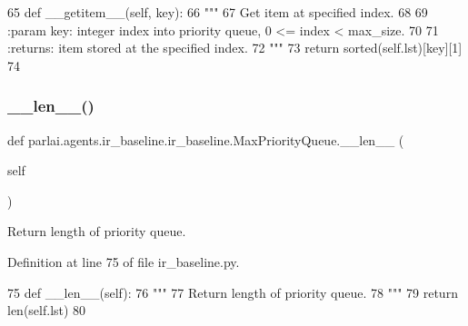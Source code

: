 \begin{DoxyCode}
65     \textcolor{keyword}{def }\_\_getitem\_\_(self, key):
66         \textcolor{stringliteral}{"""}
67 \textcolor{stringliteral}{        Get item at specified index.}
68 \textcolor{stringliteral}{}
69 \textcolor{stringliteral}{        :param key: integer index into priority queue, 0 <= index < max\_size.}
70 \textcolor{stringliteral}{}
71 \textcolor{stringliteral}{        :returns: item stored at the specified index.}
72 \textcolor{stringliteral}{        """}
73         \textcolor{keywordflow}{return} sorted(self.lst)[key][1]
74 
\end{DoxyCode}
\mbox{\label{classparlai_1_1agents_1_1ir__baseline_1_1ir__baseline_1_1MaxPriorityQueue_a7b1b8f3a2f17a0d4bd3c202bc3bdee78}} 
\subsubsection{\texorpdfstring{\+\_\+\+\_\+len\+\_\+\+\_\+()}{\_\_len\_\_()}}
{\footnotesize\ttfamily def parlai.\+agents.\+ir\+\_\+baseline.\+ir\+\_\+baseline.\+Max\+Priority\+Queue.\+\_\+\+\_\+len\+\_\+\+\_\+ (\begin{DoxyParamCaption}\item[{}]{self }\end{DoxyParamCaption})}

\begin{DoxyVerb}Return length of priority queue.
\end{DoxyVerb}
 

Definition at line 75 of file ir\+\_\+baseline.\+py.


\begin{DoxyCode}
75     \textcolor{keyword}{def }\_\_len\_\_(self):
76         \textcolor{stringliteral}{"""}
77 \textcolor{stringliteral}{        Return length of priority queue.}
78 \textcolor{stringliteral}{        """}
79         \textcolor{keywordflow}{return} len(self.lst)
80 
\end{DoxyCode}
\mbox{\label{classparlai_1_1agents_1_1ir__baseline_1_1ir__baseline_1_1MaxPriorityQueue_a0d0d7db0cf816039ca69cba4bf481f01}} 
